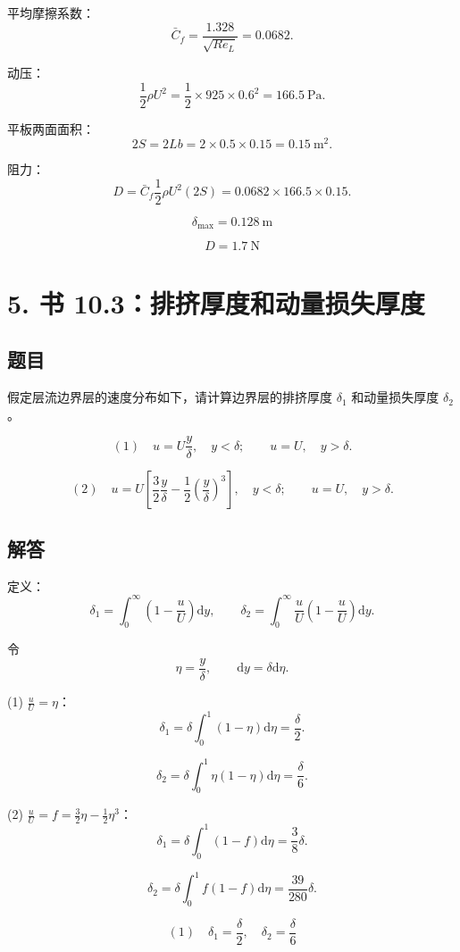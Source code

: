 \documentclass[11pt,a4paper]{ctexart}
\newcommand{\dd}{\mathrm{d}}
\begin{document}
平均摩擦系数：
\[
\bar C_f=\frac{1.328}{\sqrt{Re_L}}=0.0682.
\]

动压：
\[
\frac12\rho U^2=\frac12\times925\times0.6^2=166.5\ \mathrm{Pa}.
\]

平板两面面积：
\[
2S=2Lb=2\times0.5\times0.15=0.15\ \mathrm{m^2}.
\]

阻力：
\[
D=\bar C_f\frac12\rho U^2(2S)
=0.0682\times166.5\times0.15.
\]

\[
\boxed{\delta_{\max}=0.128\ \mathrm{m}}
\]

\[
\boxed{D=1.7\ \mathrm{N}}
\]

\section*{5. 书 10.3：排挤厚度和动量损失厚度}

\subsection*{题目}

假定层流边界层的速度分布如下，请计算边界层的排挤厚度 \(\delta_1\) 和动量损失厚度 \(\delta_2\)。

\[
(1)\quad u=U\frac{y}{\delta},\quad y<\delta;\qquad u=U,\quad y>\delta.
\]

\[
(2)\quad u=U\left[\frac{3}{2}\frac{y}{\delta}
-\frac{1}{2}\left(\frac{y}{\delta}\right)^3\right],
\quad y<\delta;\qquad u=U,\quad y>\delta.
\]

\subsection*{解答}

定义：
\[
\delta_1=\int_0^\infty\left(1-\frac{u}{U}\right)\dd y,\qquad
\delta_2=\int_0^\infty\frac{u}{U}\left(1-\frac{u}{U}\right)\dd y.
\]

令
\[
\eta=\frac{y}{\delta},\qquad \dd y=\delta\dd\eta.
\]

(1) \(\frac{u}{U}=\eta\)：
\[
\delta_1=\delta\int_0^1(1-\eta)\dd\eta=\frac{\delta}{2}.
\]

\[
\delta_2=\delta\int_0^1\eta(1-\eta)\dd\eta=\frac{\delta}{6}.
\]

(2) \(\frac{u}{U}=f=\frac32\eta-\frac12\eta^3\)：
\[
\delta_1=\delta\int_0^1(1-f)\dd\eta=\frac{3}{8}\delta.
\]

\[
\delta_2=\delta\int_0^1f(1-f)\dd\eta=\frac{39}{280}\delta.
\]

\[
\boxed{(1)\quad \delta_1=\frac{\delta}{2},\quad \delta_2=\frac{\delta}{6}}
\]
\end{document}
